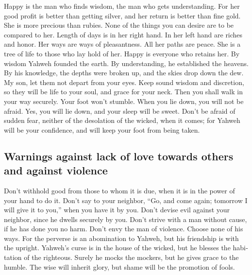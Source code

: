 \begin{paracol}{2}
\begin{otherlanguage}{english}
 Happy is the man who finds wisdom, the man who gets
understanding.  For her good profit is better than
getting silver, and her return is better than fine gold. 
She is more precious than rubies. None of the things you can desire are
to be compared to her.  Length of days is in her right
hand. In her left hand are riches and honor.  Her ways
are ways of pleasantness. All her paths are peace.  She
is a tree of life to those who lay hold of her. Happy is everyone who
retains her.  By wisdom Yahweh founded the earth. By
understanding, he established the heavens.  By his
knowledge, the depths were broken up, and the skies drop down the dew.
 My son, let them not depart from your eyes. Keep sound
wisdom and discretion,  so they will be life to your
soul, and grace for your neck.  Then you shall walk in
your way securely. Your foot won't stumble.  When you lie
down, you will not be afraid. Yes, you will lie down, and your sleep
will be sweet.  Don't be afraid of sudden fear, neither
of the desolation of the wicked, when it comes;  for
Yahweh will be your confidence, and will keep your foot from being
taken.

\hypertarget{warnings-against-lack-of-love-towards-others-and-against-violence}{%
\subsection{Warnings against lack of love towards others and against
violence}\label{warnings-against-lack-of-love-towards-others-and-against-violence}}

 Don't withhold good from those to whom it is due, when
it is in the power of your hand to do it.  Don't say to
your neighbor, ``Go, and come again; tomorrow I will give it to you,''
when you have it by you.  Don't devise evil against your
neighbor, since he dwells securely by you.  Don't strive
with a man without cause, if he has done you no harm. 
Don't envy the man of violence. Choose none of his ways. 
For the perverse is an abomination to Yahweh, but his friendship is with
the upright.  Yahweh's curse is in the house of the
wicked, but he blesses the habitation of the righteous. 
Surely he mocks the mockers, but he gives grace to the humble.
 The wise will inherit glory, but shame will be the
promotion of fools.


\end{otherlanguage}
\end{paracol}
